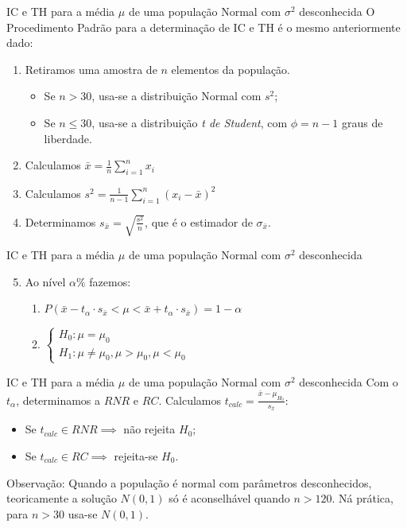 \documentclass[hyperref={pdfpagelabels=false}]{beamer}
\begin{document}
\begin{frame}{IC e TH para a média $\mu$ de uma população Normal com $\sigma^2$ desconhecida}
O Procedimento Padrão para a determinação de IC e TH é o mesmo anteriormente dado: \pause
\begin{enumerate}
	\item Retiramos uma amostra de $n$ elementos da população. \pause
	\begin{itemize}
		\item Se $n > 30$, usa-se a distribuição Normal com $s^2$; \pause
		\item Se $n \leq 30$, usa-se a distribuição \emph{t de Student}, com $\phi = n - 1$ graus de liberdade. \pause
	\end{itemize}
	\item Calculamos $\bar{x} = \displaystyle \frac{1}{n}\sum_{i = 1}^{n}x_i$ \pause
	\item Calculamos $s^2 = \displaystyle \frac{1}{n-1}\sum_{i=1}^{n}(x_i - \bar{x})^2$ \pause
	\item Determinamos $s_{\bar{x}}=\displaystyle \sqrt{\frac{s^2}{n}}$, que é o estimador de $\sigma_{\bar{x}}$.
\end{enumerate}
\end{frame}

\begin{frame}{IC e TH para a média $\mu$ de uma população Normal com $\sigma^2$ desconhecida}
	\begin{enumerate}
	\setcounter{enumi}{4}
	\item Ao nível $\alpha\%$ fazemos: \pause
	\begin{enumerate}
		\item $P(\bar{x}-t_{\alpha}\cdot s_{\bar{x}}<\mu<\bar{x}+t_{\alpha}\cdot s_{\bar{x}}) = 1 - \alpha$ \pause
		\item $\begin{cases}
		H_0:\mu=\mu_0\\
		H_1:\mu\neq\mu_0,\mu > \mu_0, \mu < \mu_0
		\end{cases}$
	\end{enumerate}
\end{enumerate}
\end{frame}

\begin{frame}{IC e TH para a média $\mu$ de uma população Normal com $\sigma^2$ desconhecida}
Com o $t_{\alpha}$, determinamos a $RNR$ e $RC$. \pause Calculamos $t_{calc} = \displaystyle \frac{\bar{x} - \mu_{H_0}}{s_{\bar{x}}}$: \pause
\begin{itemize}
	\item Se $t_{calc} \in RNR \implies$ não rejeita $H_0$; \pause
	\item Se $t_{calc} \in RC \implies$ rejeita-se $H_0$. \pause
\end{itemize}

Observação: Quando a população é normal com parâmetros desconhecidos, teoricamente a solução $N(0,1)$ só é aconselhável quando $n>120$. Ná prática, para $n>30$ usa-se $N(0,1)$.
\end{frame}
\end{document}

